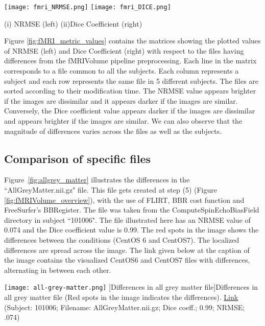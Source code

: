 \begin{center}
\texttt{[image: fmri\_NRMSE.png]}%
\texttt{[image: fmri\_DICE.png]}
\caption*{(i) NRMSE (left) (ii)Dice Coefficient (right)}
\label{fig:fMRI_metric_values}
\end{center}

Figure \ref{fig:fMRI_metric_values} contains the matrices showing the plotted values of NRMSE (left) and Dice Coefficient (right) with respect to the files having differences from the fMRIVolume pipeline preprocessing. Each line in the matrix corresponds to a file common to all the subjects. Each column represents a subject and each row represents the same file in 5 different subjects. The files are sorted according to their modification time. The NRMSE value appears brighter if the images are dissimilar and it appears darker if the images are similar. Conversely, the Dice coefficient value appears darker if the images are dissimilar and appears brighter if the images are similar. We can also observe that the magnitude of differences varies across the files as well as the subjects.

\subsection{Comparison of specific files}
Figure~\ref{fig:allgrey_matter} illustrates the differences in the ``AllGreyMatter.nii.gz" file. This file gets created at step (5) (Figure \ref{fig:fMRIVolume_overview}), with the use of FLIRT, BBR cost function and FreeSurfer's BBRegister. The file was taken from the ComputeSpinEchoBiasField directory in subject ``101006". The file illustrated here has an NRMSE value of 0.074 and the Dice coefficient value is 0.99. The red spots in the image shows the differences between the conditions (CentOS 6 and CentOS7). The localized differences are spread across the image. The link given below at the caption of the image contains the visualized CentOS6 and CentOS7 files with differences, alternating in between each other.

\begin{center}
\texttt{[image: all-grey-matter.png]}
[Differences in all grey matter file]{Differences in all grey matter file (Red spots in the image indicates the differences). \href{https://drive.google.com/file/d/1dzpyMalJ6_ox8jLedKvhKrP2ew7C7N-r/view?usp=sharing}{Link}\\{(Subject: 101006; Filename: AllGreyMatter.nii.gz; Dice coeff.; 0.99; NRMSE; .074)}}
\label{fig:allgrey_matter}
\end{center}

